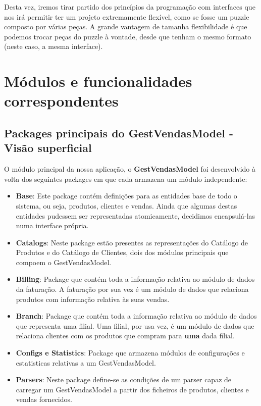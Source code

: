 \documentclass[11pt]{article}
\begin{document}
Desta vez, iremos tirar partido dos princípios da programação com interfaces que nos irá permitir ter um projeto extremamente flexível, como se fosse um puzzle composto por várias peças. A grande vantagem de tamanha flexibilidade é que podemos trocar peças do puzzle à vontade, desde que tenham o mesmo formato (neste caso, a mesma interface).

\newpage
\section{Módulos e funcionalidades correspondentes}

\subsection{Packages principais do GestVendasModel - Visão superficial}
O módulo principal da nossa aplicação, o \textbf{GestVendasModel} foi desenvolvido à volta dos seguintes packages em que cada armazena um módulo independente:

\begin{itemize}
    \item \textbf{Base}: Este package contém definições para as entidades base de todo o sistema, ou seja, produtos, clientes e vendas. Ainda que algumas destas entidades pudessem ser representadas atomicamente, decidimos encapsulá-las numa interface própria.
    \item \textbf{Catalogs}: Neste package estão presentes as representações do Catálogo de Produtos e do Catálogo de Clientes, dois dos módulos principais que compoem o GestVendasModel.
    \item \textbf{Billing}: Package que contém toda a informação relativa ao módulo de dados da faturação. A faturação por sua vez é um módulo de dados que relaciona produtos com informação relativa às suas vendas.
    \item \textbf{Branch}: Package que contém toda a informação relativa ao módulo de dados que representa uma filial. Uma filial, por usa vez, é um módulo de dados que relaciona clientes com os produtos que compram para \textbf{uma} dada filial.
    \item \textbf{Configs e Statistics}: Package que armazena módulos de configurações e estatisticas relativas a um GestVendasModel.
    \item \textbf{Parsers}: Neste package define-se as condições de um parser capaz de carregar um GestVendasModel a partir dos ficheiros de produtos, clientes e vendas fornecidos.
\end{itemize}
\end{document}
